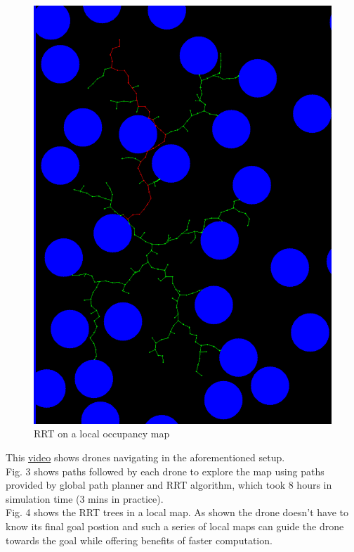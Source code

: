\begin{figure}[h]
\centering
\includegraphics[scale=0.20]{images/rrt_drone_1_iter_6.png}
\caption{RRT on a local occupancy map}
\end{figure}

This \href{https://www.youtube.com/watch?v=JBWNEh0Fis4&ab_channel=ShantnavAgarwal}{video} shows drones navigating in the aforementioned setup.\\

Fig. 3 shows paths followed by each drone to explore the map using paths provided by global path planner and RRT algorithm, which took 8 hours in simulation time (3 mins in practice). \\


Fig. 4 shows the RRT trees in a local map. As shown the drone doesn't have to know its final goal postion and such a series of local maps can guide the drone towards the goal while offering benefits of faster computation.